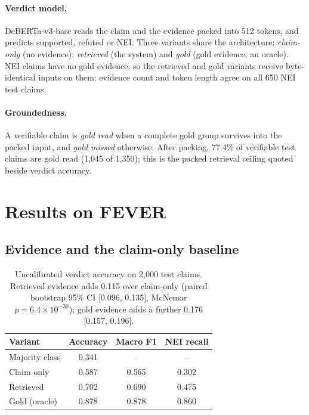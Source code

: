 \documentclass[11pt]{article}
\begin{document}
\paragraph{Verdict model.} DeBERTa-v3-base \citep{he2023debertav3} reads the claim and the evidence packed
into 512 tokens, and predicts supported, refuted or NEI. Three variants share the architecture:
\emph{claim-only} (no evidence), \emph{retrieved} (the system) and \emph{gold} (gold evidence, an oracle).
NEI claims have no gold evidence, so the retrieved and gold variants receive byte-identical inputs on them:
evidence count and token length agree on all 650 NEI test claims.

\paragraph{Groundedness.} A verifiable claim is \emph{gold read} when a complete gold group survives into
the packed input, and \emph{gold missed} otherwise. After packing, 77.4\% of verifiable test claims are gold
read (1,045 of 1,350); this is the packed retrieval ceiling quoted beside verdict accuracy.

\section{Results on FEVER}

\subsection{Evidence and the claim-only baseline}

\begin{table}[t]
\centering
\small
\begin{tabular}{lccc}
\toprule
Variant & Accuracy & Macro F1 & NEI recall \\
\midrule
Majority class & 0.341 & -- & -- \\
Claim only & 0.587 & 0.565 & 0.302 \\
Retrieved & 0.702 & 0.690 & 0.475 \\
Gold (oracle) & 0.878 & 0.878 & 0.860 \\
\bottomrule
\end{tabular}
\caption{Uncalibrated verdict accuracy on 2,000 test claims. Retrieved evidence adds 0.115 over
claim-only (paired bootstrap 95\% CI [0.096, 0.135], McNemar \citep{mcnemar1947} $p = 6.4\times10^{-30}$);
gold evidence adds a further 0.176 [0.157, 0.196].}
\label{tab:variants}
\end{table}
\end{document}
